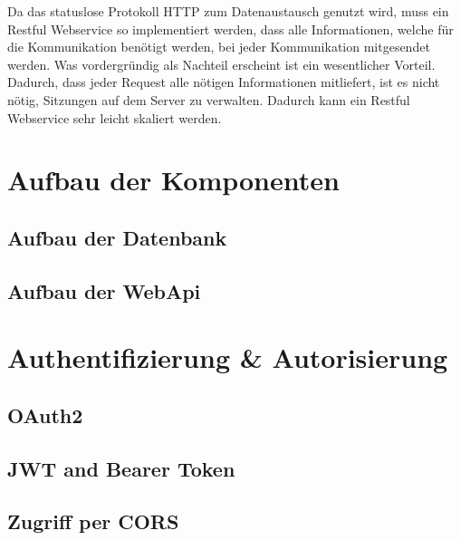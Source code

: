 Da das statuslose Protokoll HTTP zum Datenaustausch genutzt wird, muss ein Restful Webservice so implementiert werden, dass alle Informationen, welche für die Kommunikation benötigt werden, bei jeder Kommunikation mitgesendet werden. Was vordergründig als Nachteil erscheint ist ein wesentlicher Vorteil. Dadurch, dass jeder Request alle nötigen Informationen mitliefert, ist es nicht nötig, Sitzungen auf dem Server zu verwalten. Dadurch kann ein Restful Webservice sehr leicht skaliert werden. 



\section{Aufbau der Komponenten}
\label{sec:aufbau-Komponenten}

\subsection{Aufbau der Datenbank}
\label{ssec:aufbau-server-db}

\subsection{Aufbau der WebApi}
\label{ssec:aufbau-webapi}

\section{Authentifizierung \& Autorisierung}
\label{sec:server-authorisierung}

\subsection{OAuth2}
\label{ssec:oauth2}

\subsection{JWT and Bearer Token}
\label{ssec:jwt-bearer}

\subsection{Zugriff per CORS}
\label{ssec:cors}